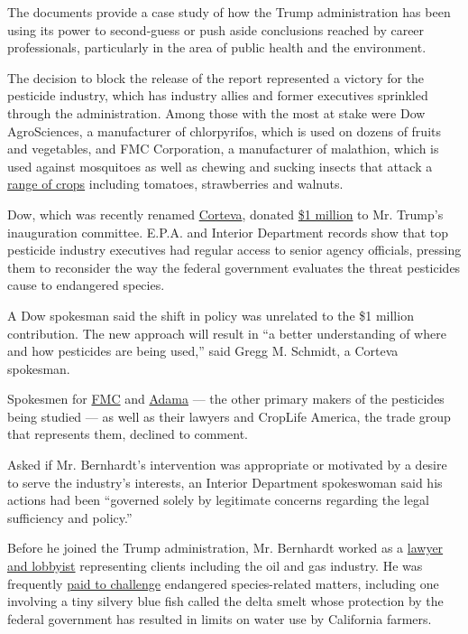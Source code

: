 The documents provide a case study of how the Trump administration has
been using its power to second-guess or push aside conclusions reached
by career professionals, particularly in the area of public health and
the environment.

The decision to block the release of the report represented a victory
for the pesticide industry, which has industry allies and former
executives sprinkled through the administration. Among those with the
most at stake were Dow AgroSciences, a manufacturer of chlorpyrifos,
which is used on dozens of fruits and vegetables, and FMC Corporation, a
manufacturer of malathion, which is used against mosquitoes as well as
chewing and sucking insects that attack a
\href{http://www.fmccrop.com/grower/Products/Insecticides-Miticides/cheminova-malathion-57ec.aspx}{range
of crops} including tomatoes, strawberries and walnuts.

Dow, which was recently renamed
\href{https://www.corteva.com/who-we-are/our-merger.html}{Corteva},
donated \href{https://www.opensecrets.org/trump/inauguration-donors}{\$1
million} to Mr. Trump's inauguration committee. E.P.A. and Interior
Department records show that top pesticide industry executives had
regular access to senior agency officials, pressing them to reconsider
the way the federal government evaluates the threat pesticides cause to
endangered species.

A Dow spokesman said the shift in policy was unrelated to the \$1
million contribution. The new approach will result in ``a better
understanding of where and how pesticides are being used,'' said Gregg
M. Schmidt, a Corteva spokesman.

Spokesmen for \href{http://www.fmc.com/}{FMC} and
\href{https://www.adama.com/en/}{Adama} --- the other primary makers of
the pesticides being studied --- as well as their lawyers and CropLife
America, the trade group that represents them, declined to comment.

Asked if Mr. Bernhardt's intervention was appropriate or motivated by a
desire to serve the industry's interests, an Interior Department
spokeswoman said his actions had been ``governed solely by legitimate
concerns regarding the legal sufficiency and policy.''

Before he joined the Trump administration, Mr. Bernhardt worked as a
\href{https://www.documentcloud.org/documents/5779173-Bernhardt-Ethics-Letter-and-Disclosure-Report.html}{lawyer
and lobbyist} representing clients including the oil and gas industry.
He was frequently
\href{https://www.nytimes.com/2019/02/12/climate/david-bernhardt-endangered-species.html}{paid
to challenge} endangered species-related matters, including one
involving a tiny silvery blue fish called the delta smelt whose
protection by the federal government has resulted in limits on water use
by California farmers.

